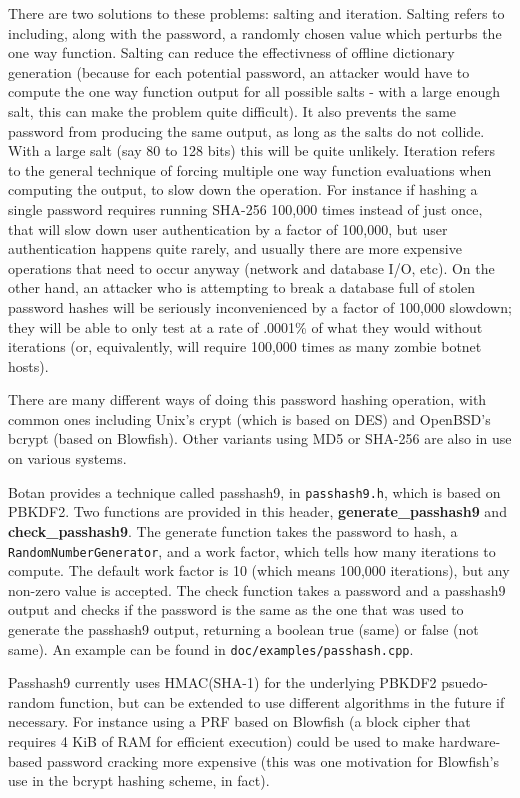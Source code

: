 \documentclass{article}
\newcommand{\filename}[1]{\texttt{#1}}
\newcommand{\function}[1]{\textbf{#1}}
\newcommand{\type}[1]{\texttt{#1}}
\begin{document}
There are two solutions to these problems: salting and
iteration. Salting refers to including, along with the password, a
randomly chosen value which perturbs the one way function. Salting can
reduce the effectivness of offline dictionary generation (because for
each potential password, an attacker would have to compute the one way
function output for all possible salts - with a large enough salt,
this can make the problem quite difficult). It also prevents the same
password from producing the same output, as long as the salts do not
collide. With a large salt (say 80 to 128 bits) this will be quite
unlikely. Iteration refers to the general technique of forcing
multiple one way function evaluations when computing the output, to
slow down the operation. For instance if hashing a single password
requires running SHA-256 100,000 times instead of just once, that will
slow down user authentication by a factor of 100,000, but user
authentication happens quite rarely, and usually there are more
expensive operations that need to occur anyway (network and database
I/O, etc). On the other hand, an attacker who is attempting to break a
database full of stolen password hashes will be seriously
inconvenienced by a factor of 100,000 slowdown; they will be able to
only test at a rate of .0001\% of what they would without iterations
(or, equivalently, will require 100,000 times as many zombie botnet
hosts).

There are many different ways of doing this password hashing
operation, with common ones including Unix's crypt (which is based on
DES) and OpenBSD's bcrypt (based on Blowfish). Other variants using
MD5 or SHA-256 are also in use on various systems.

Botan provides a technique called passhash9, in
\filename{passhash9.h}, which is based on PBKDF2. Two functions are
provided in this header, \function{generate\_passhash9} and
\function{check\_passhash9}.  The generate function takes the password
to hash, a \type{RandomNumberGenerator}, and a work factor, which
tells how many iterations to compute. The default work factor is 10
(which means 100,000 iterations), but any non-zero value is accepted.
The check function takes a password and a passhash9 output and checks
if the password is the same as the one that was used to generate the
passhash9 output, returning a boolean true (same) or false (not same).
An example can be found in \filename{doc/examples/passhash.cpp}.

Passhash9 currently uses HMAC(SHA-1) for the underlying PBKDF2
psuedo-random function, but can be extended to use different
algorithms in the future if necessary. For instance using a PRF based
on Blowfish (a block cipher that requires 4 KiB of RAM for efficient
execution) could be used to make hardware-based password cracking more
expensive (this was one motivation for Blowfish's use in the bcrypt
hashing scheme, in fact).
\end{document}
